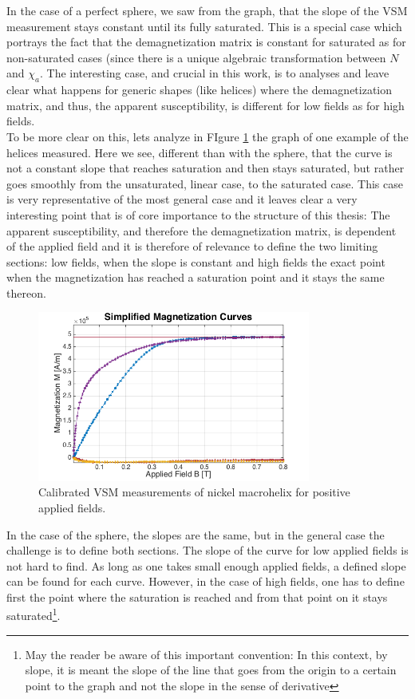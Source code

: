 In the case of a perfect sphere, we saw from the graph, that the slope of the VSM measurement stays constant until its fully saturated. This is a special case which portrays the fact that the demagnetization matrix is constant for saturated as for non-saturated cases (since there is a unique algebraic transformation between $N$ and $\chi_a$. The interesting case, and crucial in this work, is to analyses and leave clear what happens for generic shapes (like helices) where the demagnetization matrix, and thus, the apparent susceptibility, is different for low fields as for high fields.\\

 To be more clear on this, lets analyze in FIgure \ref{fig:VSMExample} the graph of one example of the helices measured. Here we see, different than with the sphere, that the curve is not a constant slope that reaches saturation and then stays saturated, but rather goes smoothly from the unsaturated, linear case, to the saturated case. This case is very representative of the most general case and it leaves clear a very interesting point that is of core importance to the structure of this thesis: The apparent susceptibility, and therefore the demagnetization matrix, is dependent of the applied field and it is therefore of relevance to define the two limiting sections: low fields, when the slope is constant and high fields the exact point when the magnetization has reached a saturation point and it stays the same thereon.\\
 
 
 \begin{figure}[ht]
	\centering
  \includegraphics[width=0.8\textwidth]{Pictures/VSMExample.png}
	\caption{Calibrated VSM measurements of nickel macrohelix for positive applied fields. }
	\label{fig:VSMExample}
\end{figure}

 
 In the case of the sphere, the slopes are the same, but in the general case the challenge is to define both sections. The slope of the curve for low applied fields is not hard to find. As long as one takes small enough applied fields, a defined slope can be found for each curve. However, in the case of high fields, one has to define first the point where the saturation is reached and from that point on it stays saturated\footnote{May the reader be aware of this important convention: In this context, by slope, it is meant the slope of the line that goes from the origin to a certain point to the graph and not the slope in the sense of derivative}.\\
 
